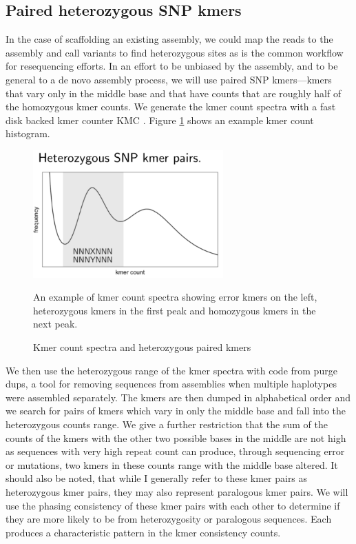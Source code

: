 \subsection{Paired heterozygous SNP kmers}
\par{
In the case of scaffolding an existing assembly, we could map the reads to the assembly and call variants to find heterozygous sites as is the common workflow for resequencing efforts. In an effort to be unbiased by the 
assembly, and to be general to a de novo assembly process, we will use paired SNP kmers---kmers that vary only in the middle base and that have counts that are roughly half of the homozygous kmer counts. We generate the 
kmer count spectra with a fast disk backed kmer counter KMC \cite{kmc}\cite{kmc2}\cite{kmc3}. Figure \ref{figure:kmc} shows an example kmer count histogram. 
}

\begin{figure}[htbp!]

\caption{Kmer count spectra and heterozygous paired kmers}
\label{figure:kmc}
\begin{centering}
\includegraphics[width=0.65\textwidth]{kmc.png}
\par{An example of kmer count spectra showing error kmers on the left, heterozygous kmers in the first peak and homozygous kmers in the next peak.}
\end{centering}
\end{figure}

\par{
We then use the heterozygous range of the kmer spectra with code from purge dups, a tool for removing sequences from assemblies when multiple haplotypes were assembled separately\cite{purgedups}. The kmers are then dumped in alphabetical order and we search for pairs of kmers which vary in only the middle base and fall into the heterozygous counts range. We give a further restriction that the sum of the counts of the kmers with the other two possible bases in the middle are not high as sequences with very high repeat count can produce, through sequencing error or mutations, two kmers in these counts range with the middle base altered. It should also be noted, that while I generally refer to these kmer pairs as heterozygous kmer pairs, they may also represent paralogous kmer pairs. We will use the phasing consistency of these kmer pairs with each other to determine if they are more likely to be from heterozygosity or paralogous sequences. Each produces a characteristic pattern in the kmer consistency counts.
}

